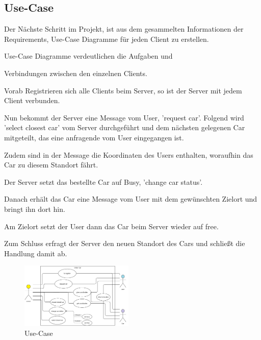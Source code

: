 \subsection{Use-Case}

Der Nächste Schritt im Projekt, ist aus dem gesammelten Informationen der Requirements, Use-Case Diagramme für jeden Client zu erstellen.


Use-Case Diagramme verdeutlichen die 
Aufgaben und 

Verbindungen zwischen den einzelnen Clients.


Vorab Registrieren sich alle Clients beim Server, so ist der Server mit jedem Client verbunden.


Nun bekommt der Server eine Message vom User, 'request car'.
Folgend wird 'select closest car' vom Server durchgeführt und dem nächsten gelegenen Car mitgeteilt, das eine anfragende vom User eingegangen ist.

Zudem sind in der Message die Koordinaten des Users enthalten, woraufhin das Car zu diesem Standort fährt.

Der Server setzt das bestellte Car auf Busy, 'change car status'.


Danach erhält das Car eine Message vom User mit dem gewünschten Zielort und bringt ihn dort hin.


Am Zielort setzt der User dann das Car beim Server wieder auf free.


Zum Schluss erfragt der Server den neuen Standort des Cars und schließt die Handlung damit ab.



\begin{figure}[htbp] 
  \centering
     \includegraphics[width=0.48\textwidth]{Use-Case_Server.png}
     \caption{Use-Case}
\end{figure}


